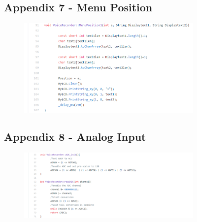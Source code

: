 \documentclass[11pt]{article}
\begin{document}
\begin{figure}
\subsection{Appendix 7 - Menu Position}
    \begin{subfigure}{\textwidth}
    \centering
    \includegraphics[width=1.2\textwidth]{Images/Menu_2.png}
    \end{subfigure}    
    \subsection{Appendix 8 - Analog Input}
    \begin{subfigure}{\textwidth}
    \centering
    \includegraphics[width=1.5\textwidth]{Images/ADC_3.png}
    \end{subfigure}    
\end{figure}
\end{document}
